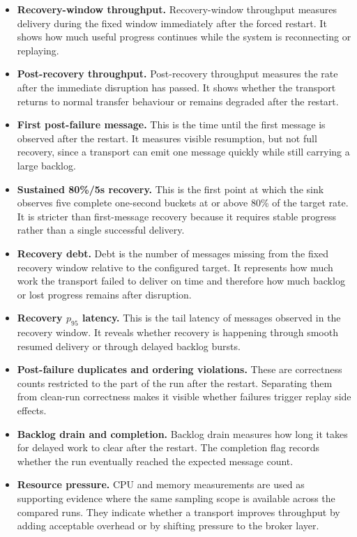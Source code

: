 \begin{itemize}
    \item \textbf{Recovery-window throughput.} Recovery-window throughput measures delivery during the fixed window immediately after the forced restart. It shows how much useful progress continues while the system is reconnecting or replaying.
    \item \textbf{Post-recovery throughput.} Post-recovery throughput measures the rate after the immediate disruption has passed. It shows whether the transport returns to normal transfer behaviour or remains degraded after the restart.
    \item \textbf{First post-failure message.} This is the time until the first message is observed after the restart. It measures visible resumption, but not full recovery, since a transport can emit one message quickly while still carrying a large backlog.
    \item \textbf{Sustained 80\%/5s recovery.} This is the first point at which the sink observes five complete one-second buckets at or above 80\% of the target rate. It is stricter than first-message recovery because it requires stable progress rather than a single successful delivery.
    \item \textbf{Recovery debt.} Debt is the number of messages missing from the fixed recovery window relative to the configured target. It represents how much work the transport failed to deliver on time and therefore how much backlog or lost progress remains after disruption.
    \item \textbf{Recovery $p_{95}$ latency.} This is the tail latency of messages observed in the recovery window. It reveals whether recovery is happening through smooth resumed delivery or through delayed backlog bursts.
    \item \textbf{Post-failure duplicates and ordering violations.} These are correctness counts restricted to the part of the run after the restart. Separating them from clean-run correctness makes it visible whether failures trigger replay side effects.
    \item \textbf{Backlog drain and completion.} Backlog drain measures how long it takes for delayed work to clear after the restart. The completion flag records whether the run eventually reached the expected message count.
    \item \textbf{Resource pressure.} CPU and memory measurements are used as supporting evidence where the same sampling scope is available across the compared runs. They indicate whether a transport improves throughput by adding acceptable overhead or by shifting pressure to the broker layer.
\end{itemize}


